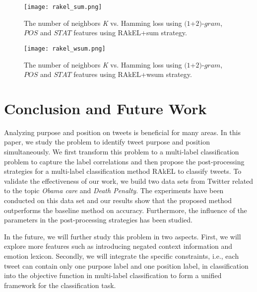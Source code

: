 \documentclass[letterpaper]{article}
\begin{document}
\begin{figure}[th]
\centering
\texttt{[image: rakel\_sum.png]}
\caption{The number of neighbors \textit{K} vs. Hamming loss using $(1$+$2)$-$gram$, $POS$ and $STAT$ features using RAkEL+sum strategy.}
\label{fig:rakel_sum}
\end{figure}

\begin{figure}[th]
\centering
\texttt{[image: rakel\_wsum.png]}
\caption{The number of neighbors \textit{K} vs. Hamming loss using $(1$+$2)$-$gram$, $POS$ and $STAT$ features using RAkEL+wsum strategy.}
\label{fig:rakel_wsum}
\end{figure}

\section{Conclusion and Future Work}
\label{sec:conclusions}
Analyzing purpose and position on tweets is beneficial for many areas. In this paper, we study the problem to identify tweet purpose and position simultaneously. We first transform this problem to a multi-label classification problem to capture the label correlations and then propose the post-processing strategies for a multi-label classification method RAkEL to classify tweets. To validate the effectiveness of our work, we build two data sets from Twitter related to the topic \textit{Obama care} and \textit{Death Penalty}. The experiments have been conducted on this data set and our results show that the proposed method outperforms the baseline method on accuracy. Furthermore, the influence of the parameters in the post-processing strategies has been studied.

In the future, we will further study this problem in two aspects. First, we will explore more features such as introducing negated context information and emotion lexicon. Secondly, we will integrate the specific constraints, i.e., each tweet can contain only one purpose label and one position label, in classification into the objective function in multi-label classification to form a unified framework for the classification task.



\end{document}
